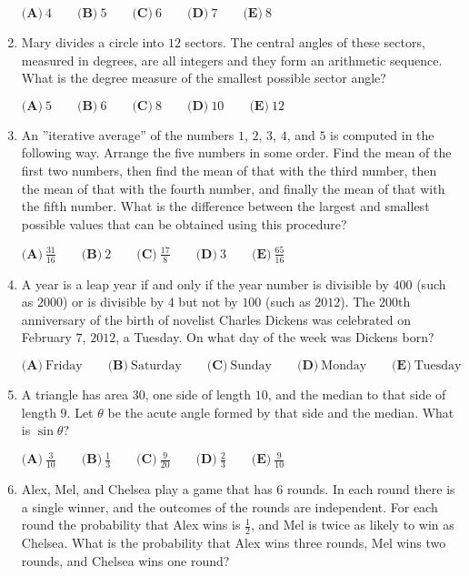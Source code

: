\documentclass{article}
\begin{document}
\begin{enumerate}[label=\arabic*., itemsep=0.5em]
\( \textbf{(A)}\ 4\qquad\textbf{(B)}\ 5\qquad\textbf{(C)}\ 6\qquad\textbf{(D)}\ 7\qquad\textbf{(E)}\ 8 \)\par \vspace{0.5em}\item Mary divides a circle into \(12\) sectors.  The central angles of these sectors, measured in degrees, are all integers and they form an arithmetic sequence.  What is the degree measure of the smallest possible sector angle?

\( \textbf{(A)}\ 5\qquad\textbf{(B)}\ 6\qquad\textbf{(C)}\ 8\qquad\textbf{(D)}\ 10\qquad\textbf{(E)}\ 12 \)\par \vspace{0.5em}\item An ''iterative average'' of the numbers \(1\), \(2\), \(3\), \(4\), and \(5\) is computed in the following way.  Arrange the five numbers in some order.  Find the mean of the first two numbers, then find the mean of that with the third number, then the mean of that with the fourth number, and finally the mean of that with the fifth number.  What is the difference between the largest and smallest possible values that can be obtained using this procedure?

\( \textbf{(A)}\ \frac{31}{16}\qquad\textbf{(B)}\ 2\qquad\textbf{(C)}\ \frac{17}{8}\qquad\textbf{(D)}\ 3\qquad\textbf{(E)}\ \frac{65}{16} \)\par \vspace{0.5em}\item A year is a leap year if and only if the year number is divisible by \(400\) (such as \(2000\)) or is divisible by \(4\) but not by \(100\) (such as \(2012\)).  The \(200\text{th}\) anniversary of the birth of novelist Charles Dickens was celebrated on February \(7\), \(2012\), a Tuesday.  On what day of the week was Dickens born?

\( \textbf{(A)}\ \text{Friday}
\qquad\textbf{(B)}\ \text{Saturday}
\qquad\textbf{(C)}\ \text{Sunday}
\qquad\textbf{(D)}\ \text{Monday}
\qquad\textbf{(E)}\ \text{Tuesday}
 \)\par \vspace{0.5em}\item A triangle has area \(30\), one side of length \(10\), and the median to that side of length \(9\).  Let \(\theta\) be the acute angle formed by that side and the median.  What is \(\sin{\theta}\)?

\( \textbf{(A)}\ \frac{3}{10}\qquad\textbf{(B)}\ \frac{1}{3}\qquad\textbf{(C)}\ \frac{9}{20}\qquad\textbf{(D)}\ \frac{2}{3}\qquad\textbf{(E)}\ \frac{9}{10} \)\par \vspace{0.5em}\item Alex, Mel, and Chelsea play a game that has \(6\) rounds.  In each round there is a single winner, and the outcomes of the rounds are independent.  For each round the probability that Alex wins is \(\frac{1}{2}\), and Mel is twice as likely to win as Chelsea.  What is the probability that Alex wins three rounds, Mel wins two rounds, and Chelsea wins one round?


\end{enumerate}
\end{document}
